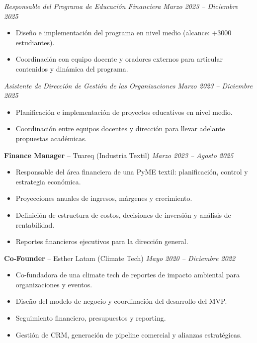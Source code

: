 \documentclass[10pt, letterpaper]{article}
\begin{document}
\textit{Responsable del Programa de Educación Financiera} \hfill \textit{Marzo 2023 – Diciembre 2025}
\begin{itemize}
    \item Diseño e implementación del programa en nivel medio (alcance: +3000 estudiantes).
    \item Coordinación con equipo docente y oradores externos para articular contenidos y dinámica del programa.
\end{itemize}

\textit{Asistente de Dirección de Gestión de las Organizaciones} \hfill \textit{Marzo 2023 – Diciembre 2025}
\begin{itemize}
    \item Planificación e implementación de proyectos educativos en nivel medio.
    \item Coordinación entre equipos docentes y dirección para llevar adelante propuestas académicas.
\end{itemize}
\vspace{0.1cm}

\textbf{Finance Manager} – Tuareq (Industria Textil) \hfill \textit{Marzo 2023 – Agosto 2025}
\begin{itemize}
    \item Responsable del área financiera de una PyME textil: planificación, control y estrategia económica.
    \item Proyecciones anuales de ingresos, márgenes y crecimiento.
    \item Definición de estructura de costos, decisiones de inversión y análisis de rentabilidad.
    \item Reportes financieros ejecutivos para la dirección general.
\end{itemize}
\vspace{0.1cm}

\textbf{Co-Founder} – Esther Latam (Climate Tech) \hfill \textit{Mayo 2020 – Diciembre 2022}
\begin{itemize}
    \item Co-fundadora de una climate tech de reportes de impacto ambiental para organizaciones y eventos.
    \item Diseño del modelo de negocio y coordinación del desarrollo del MVP.
    \item Seguimiento financiero, presupuestos y reporting.
    \item Gestión de CRM, generación de pipeline comercial y alianzas estratégicas.
\end{itemize}
\end{document}
